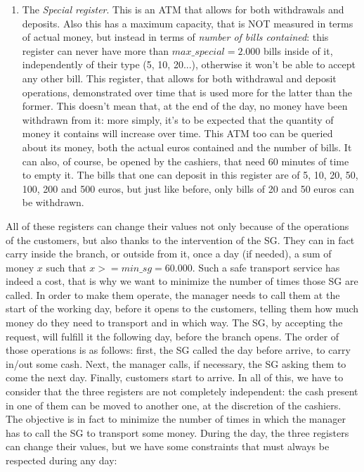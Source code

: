 \documentclass{article}
\begin{document}
\begin{enumerate}
\item The \emph{Special register}. This is an ATM that allows for both withdrawals and deposits. Also this has a maximum capacity, that is NOT measured in terms of actual money, but instead in terms of \emph{number of bills contained}: this register can never have more than $max\_special = 2.000$ bills inside of it, independently of their type (5, 10, 20...), otherwise it won't be able to accept any other bill. This register, that allows for both withdrawal and deposit operations, demonstrated over time that is used more for the latter than the former. This doesn't mean that, at the end of the day, no money have been withdrawn from it: more simply, it's to be expected that the quantity of money it contains will increase over time. This ATM too can be queried about its money, both the actual euros contained and the number of bills. It can also, of course, be opened by the cashiers, that need 60 minutes of time to empty it. The bills that one can deposit in this register are of 5, 10, 20, 50, 100, 200 and 500 euros, but just like before, only bills of 20 and 50 euros can be withdrawn.
\end{enumerate}
All of these registers can change their values not only because of the operations of the customers, but also thanks to the intervention of the SG. They can in fact carry inside the branch, or outside from it, once a day (if needed), a sum of money $x$ such that $x >= min\_sg = 60.000$. Such a safe transport service has indeed a cost, that is why we want to minimize the number of times those SG are called. In order to make them operate, the manager needs to call them at the start of the working day, before it opens to the customers, telling them how much money do they need to transport and in which way. The SG, by accepting the request, will fulfill it the following day, before the branch opens. The order of those operations is as follows: first, the SG called the day before arrive, to carry in/out some cash. Next, the manager calls, if necessary, the SG asking them to come the next day. Finally, customers start to arrive. 
\newline
In all of this, we have to consider that the three registers are not completely independent: the cash present in one of them can be moved to another one, at the discretion of the cashiers. The objective is in fact to minimize the number of times in which the manager has to call the SG to transport some money. During the day, the three registers can change their values, but we have some constraints that must always be respected during any day:
\end{document}
